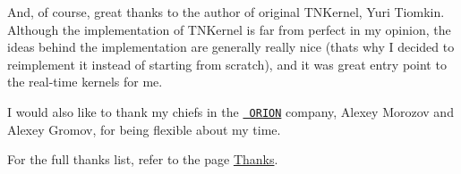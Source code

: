 And, of course, great thanks to the author of original T\+N\+Kernel, Yuri Tiomkin. Although the implementation of T\+N\+Kernel is far from perfect in my opinion, the ideas behind the implementation are generally really nice (that\textquotesingle{}s why I decided to reimplement it instead of starting from scratch), and it was great entry point to the real-\/time kernels for me.

I would also like to thank my chiefs in the \href{http://orionspb.ru/}{\texttt{ O\+R\+I\+ON}} company, Alexey Morozov and Alexey Gromov, for being flexible about my time.

For the full thanks list, refer to the page \mbox{\hyperlink{thanks}{Thanks}}. 